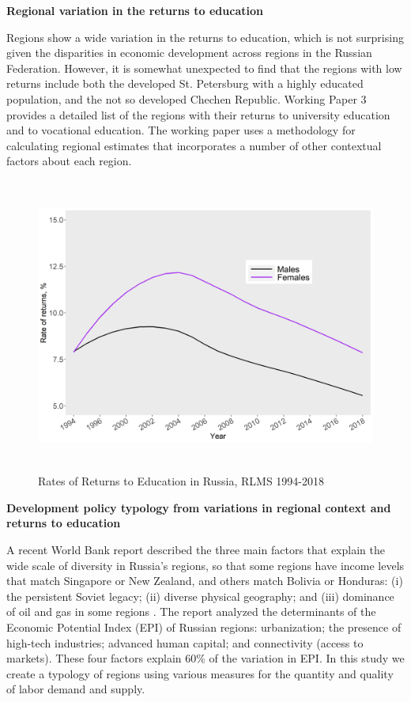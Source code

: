 \documentclass[alpha-refs]{wiley-article-04t}
\begin{document}
\hspace{-1.75em} \textbf{Regional variation in the returns to 
education}

\vspace{1em}

Regions show a wide variation in the returns to education, which is not 
surprising given the disparities in economic development across regions in 
the Russian Federation.  However, it is somewhat unexpected to find  that 
the regions with low  returns include both the developed St. Petersburg 
with a highly educated population, and the not so developed Chechen 
Republic. Working Paper 3 provides a detailed list of the regions with 
their returns to university  education and to vocational education.  
The working paper uses a methodology for calculating regional estimates 
that incorporates a number of other contextual factors about each region.

\begin{figure}[htbp!]
	\centering
	\includegraphics[width=\textwidth, height=275pt]{re_edu2.png}
	\caption{Rates of Returns to Education in Russia, RLMS 
	1994-2018}\label{fig:1.2}
\end{figure}


\hspace{-1.75em} \textbf{Development policy typology from variations in 
regional context and returns to education}

A recent World Bank report described the three main factors that explain 
the wide scale of diversity in Russia's regions, so that some regions 
have income levels that match Singapore or New Zealand, and others match 
Bolivia or Honduras: (i) the persistent Soviet legacy; (ii) diverse 
physical geography; and (iii) dominance of oil and gas in some regions 
\parencite{worldbank2018}. The report analyzed the determinants of the 
Economic Potential Index (EPI) of Russian regions: urbanization; the 
presence of high-tech industries; advanced human capital; 
and connectivity (access to markets). These four factors explain 60\% of 
the variation in EPI. In this study we create a typology of regions using 
various measures for the quantity and quality of labor demand and supply. 
\end{document}
